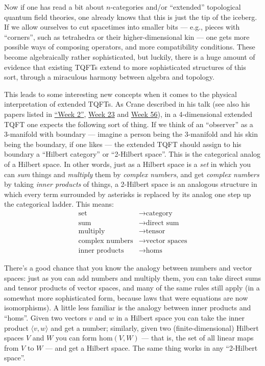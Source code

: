 \documentclass{article}
\begin{document}
Now if one has read a bit about \(n\)-categories and/or ``extended''
topological quantum field theories, one already knows that this is just
the tip of the iceberg. If we allow ourselves to cut spacetimes into
smaller bits --- e.g., pieces with ``corners'', such as tetrahedra or
their higher-dimensional kin --- one gets more possible ways of
composing operators, and more compatibility conditions. These become
algebraically rather sophisticated, but luckily, there is a huge amount
of evidence that existing TQFTs extend to more sophisticated structures
of this sort, through a miraculous harmony between algebra and topology.

This leads to some interesting new concepts when it comes to the
physical interpretation of extended TQFTs. As Crane described in his
talk (see also his papers listed in \protect\hyperlink{week2}{``Week
2''}, \protect\hyperlink{week23}{Week 23} and
\protect\hyperlink{week56}{Week 56}), in a 4-dimensional extended TQFT
one expects the following sort of thing. If we think of an ``observer''
as a 3-manifold with boundary --- imagine a person being the 3-manifold
and his skin being the boundary, if one likes --- the extended TQFT
should assign to his boundary a ``Hilbert category'' or ``2-Hilbert
space''. This is the categorical analog of a Hilbert space. In other
words, just as a Hilbert space is a \emph{set} in which you can
\emph{sum} things and \emph{multiply} them by \emph{complex numbers},
and get \emph{complex numbers} by taking \emph{inner products} of
things, a 2-Hilbert space is an analogous structure in which every term
surrounded by asterisks is replaced by its analog one step up the
categorical ladder. This means: \[
  \begin{aligned}
    \text{set} &\to \text{category}
  \\\text{sum} &\to \text{direct sum}
  \\\text{multiply} &\to \text{tensor}
  \\\text{complex numbers} &\to \text{vector spaces}
  \\\text{inner products} &\to \text{homs}
  \end{aligned}
\]

There's a good chance that you know the analogy between numbers and
vector spaces: just as you can add numbers and multiply them, you can
take direct sums and tensor products of vector spaces, and many of the
same rules still apply (in a somewhat more sophisticated form, because
laws that were equations are now isomorphisms). A little less familiar
is the analogy between inner products and ``homs''. Given two vectors
\(v\) and \(w\) in a Hilbert space you can take the inner product
\(\langle v,w\rangle\) and get a number; similarly, given two
(finite-dimensional) Hilbert spaces \(V\) and \(W\) you can form
\(\mathrm{hom}(V,W)\) --- that is, the set of all linear maps from \(V\)
to \(W\) --- and get a Hilbert space. The same thing works in any
``2-Hilbert space''.
\end{document}
